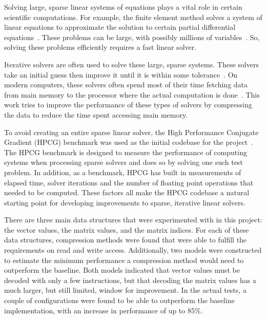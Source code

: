 Solving large, sparse linear systems of equations plays a vital role in certain scientific computations.
For example, the finite element method solves a system of linear equations to approximate the solution to certain partial differential equations~\cite{Saad:2003:IterativeMethods}.
These problems can be large, with possibly millions of variables~\cite{Davis:2011:FloridaMatrixCollection}.
So, solving these problems efficiently requires a fast linear solver.

Iterative solvers are often used to solve these large, sparse systems.
These solvers take an initial guess then improve it until it is within some tolerance~\cite{Saad:2003:IterativeMethods}.
On modern computers, these solvers often spend most of their time fetching data from main memory to the processor where the actual computation is done~\cite{Lawlor:2013:compression}.
This work tries to improve the performance of these types of solvers by compressing the data to reduce the time spent accessing main memory.

To avoid creating an entire sparse linear solver, the High Performance Conjugate Gradient (HPCG) benchmark was used as the initial codebase for the project~\cite{Dongarra:2015:HPCG}.
The HPCG benchmark is designed to measure the performance of computing systems when processing sparse solvers and does so by solving one such test problem.
In addition, as a benchmark, HPCG has built in measurements of elapsed time, solver iterations and the number of floating point operations that needed to be computed.
These factors all make the HPCG codebase a natural starting point for developing improvements to sparse, iterative linear solvers.

There are three main data structures that were experimented with in this project: the vector values, the matrix values, and the matrix indices.
For each of these data structures, compression methods were found that were able to fulfill the requirements on read and write access.
Additionally, two models were constructed to estimate the minimum performance a compression method would need to outperform the baseline.
Both models indicated that vector values must be decoded with only a few instructions, but that decoding the matrix values has a much larger, but still limited, window for improvement.
In the actual tests, a couple of configurations were found to be able to outperform the baseline implementation, with an increase in performance of up to 85\%.

